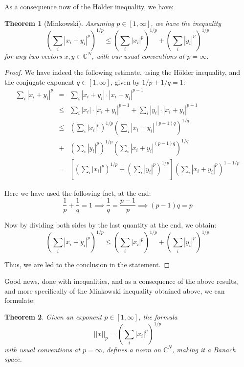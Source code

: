 \documentclass[12pt]{amsbook}
\newtheorem{theorem}{Theorem}[chapter]
\begin{document}
As a consequence now of the H\"older inequality, we have:


\begin{theorem}[Minkowski]
Assuming $p\in[1,\infty]$, we have the inequality
$$\left(\sum_i|x_i+y_i|^p\right)^{1/p}\leq \left(\sum_i|x_i|^p\right)^{1/p}+\left(\sum_i|y_i|^p\right)^{1/p}$$
for any two vectors $x,y\in\mathbb C^N$, with our usual conventions at $p=\infty$.
\end{theorem}

\begin{proof}
We have indeed the following estimate, using the H\"older inequality, and the conjugate exponent $q\in[1,\infty]$, given by $1/p+1/q=1$:
\begin{eqnarray*}
\sum_i|x_i+y_i|^p
&=&\sum_i|x_i+y_i|\cdot|x_i+y_i|^{p-1}\\
&\leq&\sum_i|x_i|\cdot|x_i+y_i|^{p-1}+\sum_i|y_i|\cdot|x_i+y_i|^{p-1}\\
&\leq&\left(\sum_i|x_i|^p\right)^{1/p}\left(\sum_i|x_i+y_i|^{(p-1)q}\right)^{1/q}\\
&+&\left(\sum_i|y_i|^p\right)^{1/p}\left(\sum_i|x_i+y_i|^{(p-1)q}\right)^{1/q}\\
&=&\left[\left(\sum_i|x_i|^p\right)^{1/p}+\left(\sum_i|y_i|^p\right)^{1/p}\right]\left(\sum_i|x_i+y_i|^p\right)^{1-1/p}
\end{eqnarray*}

Here we have used the following fact, at the end:
$$\frac{1}{p}+\frac{1}{q}=1\implies\frac{1}{q}=\frac{p-1}{p}\implies(p-1)q=p$$

Now by dividing both sides by the last quantity at the end, we obtain:
$$\left(\sum_i|x_i+y_i|^p\right)^{1/p}\leq \left(\sum_i|x_i|^p\right)^{1/p}+\left(\sum_i|y_i|^p\right)^{1/p}$$

Thus, we are led to the conclusion in the statement.
\end{proof}

Good news, done with inequalities, and as a consequence of the above results, and more specifically of the Minkowski inequality obtained above, we can formulate:


\begin{theorem}
Given an exponent $p\in[1,\infty]$, the formula
$$||x||_p=\left(\sum_i|x_i|^p\right)^{1/p}$$
with usual conventions at $p=\infty$, defines a norm on $\mathbb C^N$, making it a Banach space.
\end{theorem}
\end{document}
